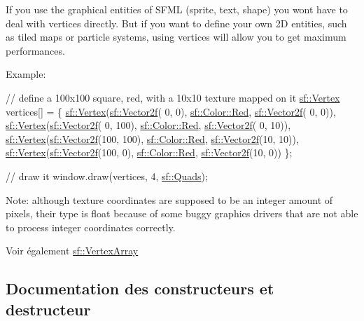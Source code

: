 If you use the graphical entities of S\+F\+ML (sprite, text, shape) you won\textquotesingle{}t have to deal with vertices directly. But if you want to define your own 2D entities, such as tiled maps or particle systems, using vertices will allow you to get maximum performances.

Example\+: 
\begin{DoxyCode}
\textcolor{comment}{// define a 100x100 square, red, with a 10x10 texture mapped on it}
\hyperlink{classsf_1_1Vertex}{sf::Vertex} vertices[] =
\{
    \hyperlink{classsf_1_1Vertex}{sf::Vertex}(\hyperlink{classsf_1_1Vector2}{sf::Vector2f}(  0,   0), \hyperlink{classsf_1_1Color_a127dbf55db9c07d0fa8f4bfcbb97594a}{sf::Color::Red}, 
      \hyperlink{classsf_1_1Vector2}{sf::Vector2f}( 0,  0)),
    \hyperlink{classsf_1_1Vertex}{sf::Vertex}(\hyperlink{classsf_1_1Vector2}{sf::Vector2f}(  0, 100), \hyperlink{classsf_1_1Color_a127dbf55db9c07d0fa8f4bfcbb97594a}{sf::Color::Red}, 
      \hyperlink{classsf_1_1Vector2}{sf::Vector2f}( 0, 10)),
    \hyperlink{classsf_1_1Vertex}{sf::Vertex}(\hyperlink{classsf_1_1Vector2}{sf::Vector2f}(100, 100), \hyperlink{classsf_1_1Color_a127dbf55db9c07d0fa8f4bfcbb97594a}{sf::Color::Red}, 
      \hyperlink{classsf_1_1Vector2}{sf::Vector2f}(10, 10)),
    \hyperlink{classsf_1_1Vertex}{sf::Vertex}(\hyperlink{classsf_1_1Vector2}{sf::Vector2f}(100,   0), \hyperlink{classsf_1_1Color_a127dbf55db9c07d0fa8f4bfcbb97594a}{sf::Color::Red}, 
      \hyperlink{classsf_1_1Vector2}{sf::Vector2f}(10,  0))
\};

\textcolor{comment}{// draw it}
window.draw(vertices, 4, \hyperlink{group__graphics_gga5ee56ac1339984909610713096283b1ba5041359b76b4bd3d3e6ef738826b8743}{sf::Quads});
\end{DoxyCode}


Note\+: although texture coordinates are supposed to be an integer amount of pixels, their type is float because of some buggy graphics drivers that are not able to process integer coordinates correctly.

\begin{DoxySeeAlso}{Voir également}
\hyperlink{classsf_1_1VertexArray}{sf\+::\+Vertex\+Array} 
\end{DoxySeeAlso}


\subsection{Documentation des constructeurs et destructeur}
\mbox{\label{classsf_1_1Vertex_a4dccc5c351b73b6fac169fe442535b40}} 
